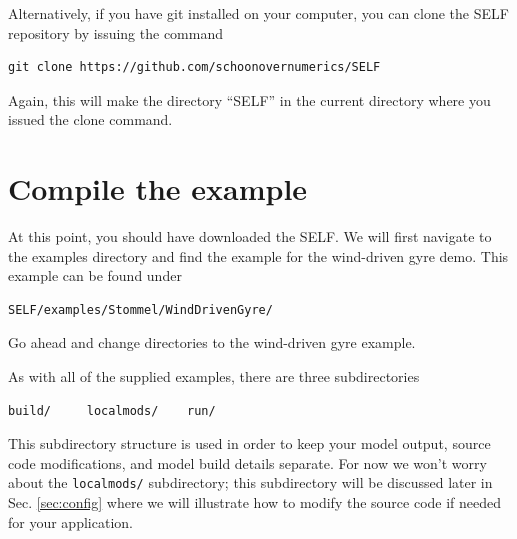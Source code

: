 \documentclass{softwaremanual}
\begin{document}
Alternatively, if you have git installed on your computer, you can clone the SELF repository by issuing the command
\begin{center}
\begin{verbatim}
git clone https://github.com/schoonovernumerics/SELF
\end{verbatim}
\end{center}
Again, this will make the directory ``SELF'' in the current directory where you issued the clone command. 

\section{Compile the example}
At this point, you should have downloaded the SELF. We will first navigate to the examples directory and find the example for the wind-driven gyre demo. This example can be found under
\begin{center}
\begin{verbatim}
SELF/examples/Stommel/WindDrivenGyre/
\end{verbatim}
\end{center}
Go ahead and change directories to the wind-driven gyre example.

As with all of the supplied examples, there are three subdirectories
\begin{center}
\begin{verbatim}
build/     localmods/    run/
\end{verbatim}
\end{center}
This subdirectory structure is used in order to keep your model output, source code modifications, and model build details separate. For now we won't worry about the \texttt{localmods/} subdirectory; this subdirectory will be discussed later in Sec. \ref{sec:config} where we will illustrate how to modify the source code if needed for your application.
\end{document}
